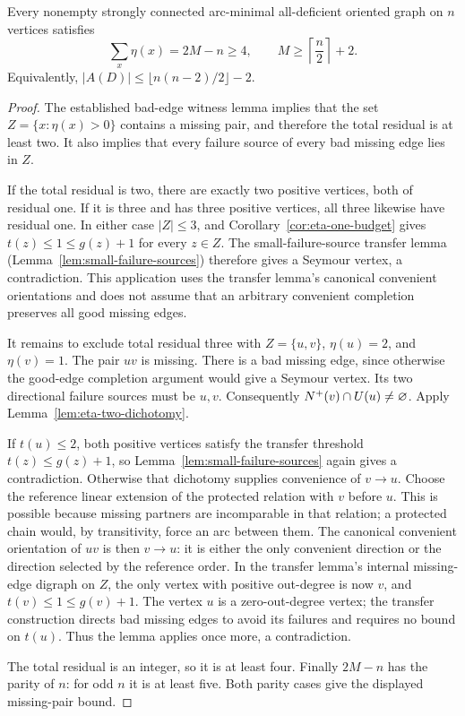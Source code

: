 \begin{theorem}
\label{thm:residual-four-margin}
Every nonempty strongly connected arc-minimal all-deficient oriented graph on
$n$ vertices satisfies
\[
 \sum_x\eta(x)=2M-n\ge4,
 \qquad
 {M\ge\left\lceil\frac n2\right\rceil+2}.
\]
Equivalently,
$|A(D)|\le\lfloor n(n-2)/2\rfloor-2$.
\end{theorem}
\begin{proof}
The established bad-edge witness lemma implies that the set
$Z=\{x:\eta(x)>0\}$ contains a missing pair, and therefore the
total residual is at least two. It also implies that every failure
source of every bad missing edge lies in $Z$.

If the total residual is two, there are exactly two positive vertices,
both of residual one. If it is three and has three positive vertices,
all three likewise have residual one. In either case $|Z|\le3$, and
Corollary~\ref{cor:eta-one-budget} gives
$t(z)\le1\le g(z)+1$ for every $z\in Z$.
The small-failure-source transfer lemma
(Lemma~\ref{lem:small-failure-sources}) therefore gives a Seymour
vertex, a contradiction. This application uses the transfer lemma's
canonical convenient orientations and does not assume that an
arbitrary convenient completion preserves all good missing edges.

It remains to exclude total residual three with
$Z=\{u,v\}$, $\eta(u)=2$, and $\eta(v)=1$. The pair $uv$ is missing.
There is a bad missing edge, since otherwise the good-edge completion
argument would give a Seymour vertex. Its two directional failure
sources must be $u,v$. Consequently
$N^+(v)\cap U(u)\ne\varnothing$.
Apply Lemma~\ref{lem:eta-two-dichotomy}.

If $t(u)\le2$, both positive vertices satisfy the transfer threshold
$t(z)\le g(z)+1$, so
Lemma~\ref{lem:small-failure-sources} again gives a contradiction.
Otherwise that dichotomy supplies convenience of $v\to u$.
Choose the reference linear extension of the protected relation with
$v$ before $u$. This is possible because missing partners are
incomparable in that relation; a protected chain would, by
transitivity, force an arc between them. The canonical convenient
orientation of $uv$ is then $v\to u$: it is either the only convenient
direction or the direction selected by the reference order.
In the transfer lemma's internal missing-edge digraph on $Z$, the only
vertex with positive out-degree is now $v$, and
$t(v)\le1\le g(v)+1$. The vertex $u$ is a zero-out-degree vertex;
the transfer construction directs bad missing edges to avoid its
failures and requires no bound on $t(u)$. Thus the lemma applies once
more, a contradiction.

The total residual is an integer, so it is at least four. Finally
$2M-n$ has the parity of $n$: for odd $n$ it is at least five.
Both parity cases give the displayed missing-pair bound.
\end{proof}
